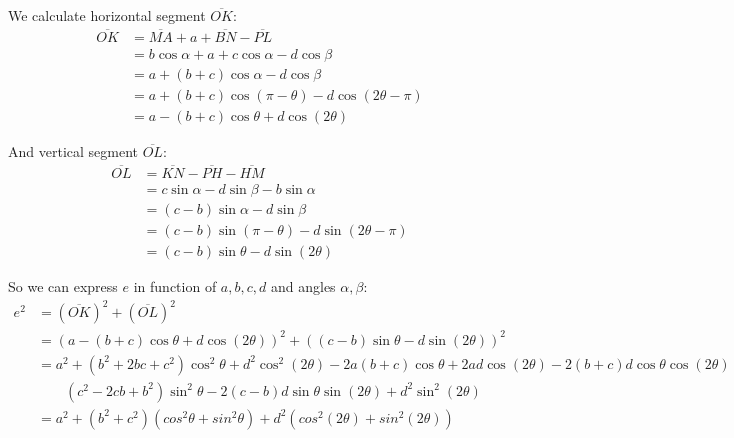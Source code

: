 \documentclass[11pt]{article}
\begin{document}
We calculate horizontal segment $\overline{OK}$:
\begin{align}
\overline{OK} &= \overline{MA} + a + \overline{BN} - \overline{PL} \nonumber\\
 &= b\cos{\alpha} + a + c\cos{\alpha} - d\cos{\beta} \nonumber\\
 &= a + (b+c)\cos{\alpha} - d\cos{\beta} \nonumber\\
 &= a + (b+c)\cos{(\pi-\theta)} - d\cos{(2\theta - \pi)} \nonumber\\
 &= a - (b+c)\cos{\theta} + d\cos{(2\theta)}
\end{align} 

And vertical segment $\overline{OL}$:
\begin{align}
\overline{OL} &= \overline{KN} - \overline{PH} - \overline{HM} \nonumber\\
 &= c\sin{\alpha} - d\sin{\beta} - b\sin{\alpha} \nonumber\\
 &= (c-b)\sin{\alpha} - d\sin{\beta} \nonumber\\
 &= (c-b)\sin{(\pi-\theta)} - d\sin{(2\theta-\pi)} \nonumber\\
 &= (c-b)\sin{\theta} - d\sin{(2\theta)}
\end{align}

So we can express $e$ in function of $a,b,c,d$ and angles $\alpha,\beta$:
\begin{align}
e^2 &= (\overline{OK})^2 + (\overline{OL})^2 \nonumber\\
 &= (a - (b+c)\cos{\theta} + d\cos{(2\theta)})^2 + ((c-b)\sin{\theta} - d\sin{(2\theta)})^2 \nonumber\\
 &= a^2 + (b^2+2bc+c^2)\cos^2{\theta} + d^2\cos^2{(2\theta)}
  -2a(b+c)\cos{\theta} + 2ad\cos{(2\theta)} - 2(b+c)d\cos{\theta}\cos{(2\theta)} \nonumber\\
  &\qquad (c^2-2cb+b^2)\sin^2{\theta} - 2(c-b)d\sin{\theta}\sin{(2\theta)} + d^2\sin^2{(2\theta)} \nonumber \\
 &= a^2 + (b^2+c^2)(cos^2{\theta}+sin^2{\theta}) +d^2(cos^2{(2\theta)}+sin^2{(2\theta)})
\end{align}
\end{document}
